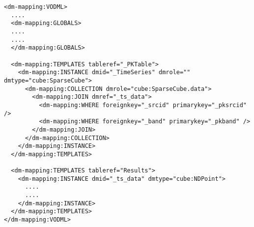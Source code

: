 \begin{lstlisting}[frame=single,label={app:join-pattern-4},caption={Joining two \texttt{TEMPLATES} together with \texttt{@dmid} \texttt{@dmref} pairs},style=XML,basicstyle=\tiny]
<dm-mapping:VODML>
  ....
  <dm-mapping:GLOBALS>
  ....
  ....
  </dm-mapping:GLOBALS>

  <dm-mapping:TEMPLATES tableref="_PKTable">
    <dm-mapping:INSTANCE dmid="_TimeSeries" dmrole="" dmtype="cube:SparseCube">
      <dm-mapping:COLLECTION dmrole="cube:SparseCube.data">
        <dm-mapping:JOIN dmref="_ts_data">
          <dm-mapping:WHERE foreignkey="_srcid" primarykey="_pksrcid" />
          <dm-mapping:WHERE foreignkey="_band" primarykey="_pkband" />
        </dm-mapping:JOIN>
      </dm-mapping:COLLECTION>
    </dm-mapping:INSTANCE>
  </dm-mapping:TEMPLATES>

  <dm-mapping:TEMPLATES tableref="Results">
    <dm-mapping:INSTANCE dmid="_ts_data" dmtype="cube:NDPoint">
      ....
      ....
    </dm-mapping:INSTANCE>
  </dm-mapping:TEMPLATES>
</dm-mapping:VODML>
\end{lstlisting}  

